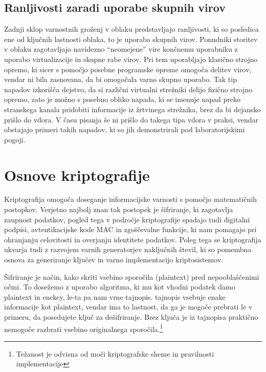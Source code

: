\documentclass[12pt,a4paper,openany,tikz]{book}
\theoremstyle{plain}
\theoremstyle{definition}
\begin{document}
\section{Ranljivosti zaradi uporabe skupnih virov}
\label{sub:Ranljivosti zaradi uporabe skupnih virov}

Zadnji sklop varnostnih groženj v oblaku predstavljajo ranljivosti, ki so posledica ene od ključnih lastnosti oblaka, to je uporaba skupnih virov. Ponudniki storitev v oblaku zagotavljajo navidezno ``neomejene'' vire končnemu uporabniku z uporabo virtualizacije in skupne rabe virov. Pri tem uporabljajo klasično strojno opremo, ki sicer s pomočjo posebne programske opreme omogoča delitev virov, vendar ni bila zasnovana, da bi omogočala varno skupno uporabo. Tak tip napadov izkorišča dejstvo, da si različni virtualni strežniki delijo fizično strojno opremo, zato je možno s posebno obliko napada, ki se imenuje napad preko stranskega kanala pridobiti informacije iz žrtvinega strežnika, brez da bi dejansko prišlo do vdora. V času pisanja še ni prišlo do takega tipa vdora v praksi, vendar obstajajo primeri takih napadov, ki so jih demonstrirali pod laboratorijskimi pogoji.

\chapter{Osnove kriptografije}

Kriptografija omogoča doseganje informacijske varnosti s pomočjo matematičnih postopkov. Verjetno najbolj znan tak postopek je šifriranje, ki zagotavlja zaupnost podatkov, pogled tega v področje kriptografije spadajo tudi digitalni podpisi, avtentikacijske kode MAC in zgoščevalne funkcije, ki nam pomagajo pri ohranjanju celovitosti in overjanju identitete podatkov. Poleg tega se kriptografija ukvarja tudi z razvojem varnih generatorjev naključnih števil, ki so pomembna osnova za generiranje ključev in varno implementacijo kriptosistemov.

Šifriranje je način, kako skriti vsebino sporočila (\gls{plaintext}) pred nepooblaščenimi očmi. To dosežemo z uporabo algoritma, ki mu kot vhodni podatek damo \gls{plaintext} in \gls{enckey}, le-ta pa nam vrne \gls{tajnopis}. \Gls{tajnopis} vsebuje enake informacije kot \gls{plaintext}, vendar ima to lastnost, da ga je mogoče prebrati le v primeru, da posedujete ključ za dešifriranje. Brez ključa je iz \gls{tajnopis}a praktično nemogoče razbrati vsebino originalnega sporočila.\footnote{Težanost je odvisna od moči kriptografske sheme in pravilnosti implementacije}
\end{document}
